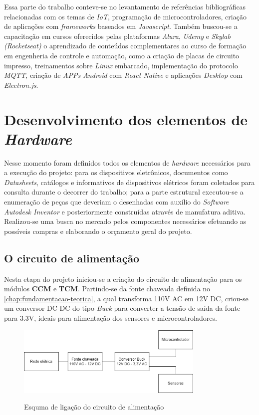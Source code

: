 Essa parte do trabalho conteve-se no levantamento de referências bibliográficas relacionadas com os temas de \textit{IoT}, programação de microcontroladores, criação de aplicações com \textit{frameworks} baseados em \textit{Javascript}. Também buscou-se a capacitação em cursos oferecidos pelas plataformas \textit{Alura}, \textit{Udemy} e \textit{Skylab (Rocketseat)} o aprendizado de conteúdos complementares ao curso de formação em engenheria de controle e automação, como a criação de placas de circuito impresso, treinamentos sobre \textit{Linux} embarcado, implementação do protocolo \textit{MQTT}, criação de \textit{APPs Android} com \textit{React Native} e aplicações \textit{Desktop} com \textit{Electron.js}.

\section{Desenvolvimento dos elementos de \textit{Hardware}}
\label{sec: dev_ele_hw}

Nesse momento foram definidos todos os elementos de \textit{hardware} necessários para a execução do projeto: para os dispositivos eletrônicos, documentos como \textit{Datasheets}, catálogos e informativos de dispositivos elétricos foram coletados para consulta durante o decorrer do trabalho; para a parte estrutural executou-se a enumeração de peças que deveriam o desenhadas com auxílio do \textit{Software Autodesk Inventor} e posteriormente construídas através de manufatura aditiva.  Realizou-se uma busca no mercado pelos componentes necessários efetuando as possíveis compras e elaborando o orçamento geral do projeto.

\subsection{O circuito de alimentação}

Nesta etapa do projeto iniciou-se a criação do circuito de alimentação para os módulos \textbf{CCM} e \textbf{TCM}. Partindo-se da fonte chaveada definida no \autoref{chap:fundamentacao-teorica}, a qual transforma 110V AC em 12V DC, criou-se um conversor DC-DC do tipo \textit{Buck} para converter a tensão de saída da fonte para 3.3V, ideais para alimentação dos sensores e microcontroladores. 

\begin{figure}[H]
	\centering
	\caption{Esquma de ligação do circuito de alimentação}
	\includegraphics[width=0.8\textwidth]{figuras/alimentacao.png}
	\label{fig:alimentacao_esquema}
\end{figure}


